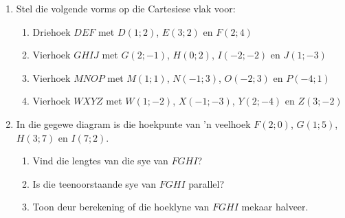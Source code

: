 \begin{eocexercises}{}
\begin{enumerate}[noitemsep, label=\textbf{\arabic*}. ] 
\item 
Stel die volgende vorms op die Cartesiese vlak voor: 
\begin{enumerate}[noitemsep, label=\textbf{(\alph*)} ]
\item Driehoek $DEF$ met $D(1;2)$, $E(3;2)$ en $F(2;4)$ 
\item Vierhoek $GHIJ$ met $G(2;-1)$, $H(0;2)$, $I(-2;-2)$ en $J(1;-3)$
\item Vierhoek $MNOP$ met $M(1;1)$, $N(-1;3)$, $O(-2;3)$ en $P(-4;1)$ 
\item Vierhoek $WXYZ$ met $W(1;-2)$, $X(-1;-3)$, $Y(2;-4)$ en $Z(3;-2)$
\end{enumerate}
\item 
In die gegewe diagram is die hoekpunte van ’n veelhoek $F(2;0)$, $G(1;5)$, $H(3;7)$ en $I(7;2)$.
    \setcounter{subfigure}{0}
    \begin{figure}[H] %
      \begin{center}
      \end{center}
    \end{figure}  
\begin{enumerate}[noitemsep, label=\textbf{(\alph*)} ]
\item Vind die lengtes van die sye van $FGHI$?
\item Is die teenoorstaande sye van $FGHI$ parallel?
\item Toon deur berekening of die hoeklyne van $FGHI$ mekaar halveer.

\end{enumerate}
\end{enumerate}
\end{eocexercises}
